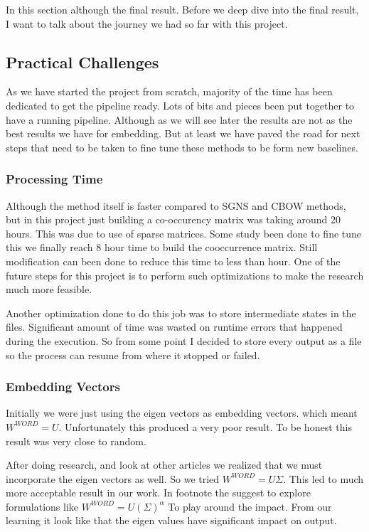 In this section although the final result. Before we deep dive into the final result, I want to talk about the journey we had so far with this project.  
\subsection{Practical Challenges}
As we have started the project from scratch,  majority of the time has been dedicated to get the pipeline ready. Lots of bits and pieces been put together to have a running pipeline. Although as we will see later the results are not as the best results we have for embedding. But at least we have paved the road for next steps that need to be taken to fine tune these methods to be form new baselines. 

\subsubsection{Processing Time}
Although the method itself is faster compared to SGNS and CBOW methods, but in this project just building a co-occurency matrix was taking around 20 hours. This was due to use of sparse matrices. Some study been done to fine tune this we finally reach 8 hour time to build the cooccurrence matrix.  Still modification can been done to reduce this time to less than hour. 
One of the future steps for this project is to perform such optimizations to make the research much more feasible. 

Another optimization done to do this job was to  store intermediate states in the files. Significant amount of time was wasted on  runtime errors that happened during the execution.  So from some point I decided to  store every output as a file so the process can resume from where it stopped or failed.

\subsubsection{Embedding Vectors}
Initially we were just using the eigen vectors as embedding vectors. which meant $W^{WORD} = U$. Unfortunately this produced a very poor result. To be honest this result was very close to random. 

After doing research, and look at other articles we realized that we must incorporate the eigen vectors as well. So we tried $W^{WORD} = U \Sigma$. This led to much more acceptable result in our work. In footnote the \cite{NIPS2014_5477} suggest to explore formulations like $W^{WORD} = U (\Sigma)^{\alpha}$  To play around the impact. From our learning it look like that the eigen values  have significant impact on output. 

